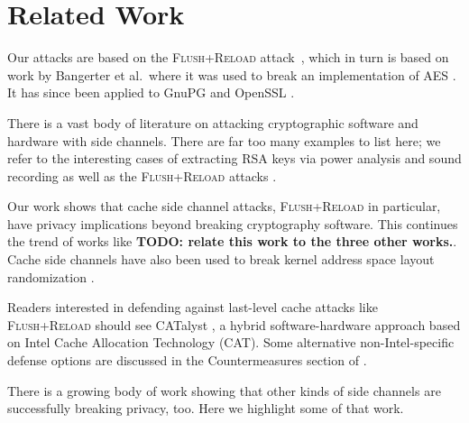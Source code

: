 \documentclass[letterpaper,twocolumn,10pt]{article}
\begin{document}
\section{Related Work}
\label{sec:relwork}


Our attacks are based on the \textsc{Flush+Reload} attack~\cite{yarom2013flush},
which in turn is based on work by Bangerter et al.\ where it was used to break
an implementation of AES \cite{gullasch2011cache}. It has since been applied to
GnuPG \cite{yarom2013flush} and OpenSSL \cite{benger2014ooh,
yarom2014recovering}.

There is a vast body of literature on attacking cryptographic software and
hardware with side channels. There are far too many examples to list here; we
refer to the interesting cases of extracting RSA keys via power analysis
\cite{messerges1999power} and sound recording \cite{genkin2013rsa} as well as
the \textsc{Flush+Reload} attacks \cite{yarom2013flush, benger2014ooh,
yarom2014recovering}.

Our work shows that cache side channel attacks, \textsc{Flush+Reload} in
particular, have privacy implications beyond breaking cryptography software.
This continues the trend of works like \textbf{TODO: relate this work to the
three other works.}. Cache side channels have also been used to break kernel
address space layout randomization \cite{hund2013practical}.

Readers interested in defending against last-level cache attacks like
\textsc{Flush+Reload} should see CATalyst \cite{liu2016catalyst}, a hybrid
software-hardware approach based on Intel Cache Allocation Technology (CAT).
Some alternative non-Intel-specific defense options are discussed in the
Countermeasures section of \cite{gruss2015cache}.

There is a growing body of work showing that other kinds of side channels are
successfully breaking privacy, too. Here we highlight some of that work.
\end{document}
